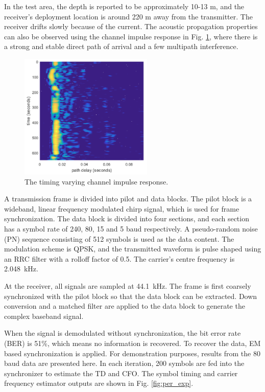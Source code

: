 \documentclass[journal,comsoc,onecolumn, 12pt,draftclsnofoot]{IEEEtran}
\begin{document}
In the test area, the depth is reported to be approximately 10-13 m, and the receiver's deployment location is around 220 m away from the transmitter.
The receiver drifts slowly because of the current.
The acoustic propagation properties can also be observed using the channel impulse response in Fig. \ref{fig:chan_impu}, where there is a strong and stable direct path of arrival and a few multipath interference.
\begin{figure}[htbp]
\centering
\includegraphics[width=2.5in]{pic/channel.png}
\caption{The timing varying channel impulse response.}
\label{fig:chan_impu} 
\end{figure}

A transmission frame is divided into pilot and data blocks. The pilot block is a wideband, linear frequency modulated chirp signal, which is used for frame synchronization.
The data block is divided into four sections, and each section has a symbol rate of 240, 80, 15 and 5 baud respectively. 
A pseudo-random noise (PN) sequence consisting of 512 symbols is used as the data content.
The modulation scheme is QPSK, and the transmitted waveform is pulse shaped using an RRC filter with a rolloff factor of 0.5. 
The carrier's centre frequency is 2.048~kHz. 

At the receiver, all signals are sampled at 44.1~kHz. The frame is first coarsely synchronized with the pilot block so that the data block can be extracted.
Down conversion and a matched filter are applied to the data block to generate the complex baseband signal.

When the signal is demodulated without synchronization, the bit error rate (BER) is 51\%, which means no information is recovered.
To recover the data, EM based synchronization is applied.
For demonstration purposes, results from the 80 baud data are presented here.
In each iteration, 200 symbols are fed into the synchronizer to estimate the TD and CFO. 
The symbol timing and carrier frequency estimator outputs are shown in Fig. \ref{fig:per_exp}.
\end{document}
